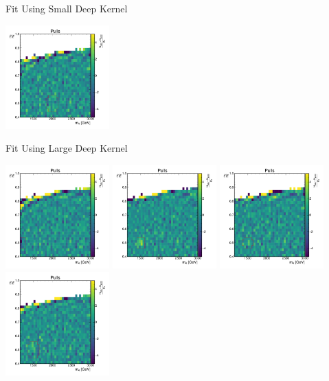 \documentclass[10pt]{beamer}
\begin{document}
\begin{frame}{Fit Using Small Deep Kernel}
\begin{center}
    \includegraphics[width=0.3\textwidth]{figures/2dpullplots/nnrbf_16_8/E_2000_0p5_150_0p07.pdf} 
  \end{center}
\end{frame}

\begin{frame}{Fit Using Large Deep Kernel}
  \begin{center}
    \includegraphics[width=0.3\textwidth]{figures/2dpullplots/nnrbf_256_128_16/E_1200_0p5_100_0p05.pdf} 
    \includegraphics[width=0.3\textwidth]{figures/2dpullplots/nnrbf_256_128_16/E_1500_0p5_100_0p05.pdf} 
    \includegraphics[width=0.3\textwidth]{figures/2dpullplots/nnrbf_256_128_16/E_1500_0p5_150_0p05.pdf} 
    \includegraphics[width=0.3\textwidth]{figures/2dpullplots/nnrbf_256_128_16/E_1500_0p5_150_0p07.pdf} 

\end{center}
\end{frame}
\end{document}
